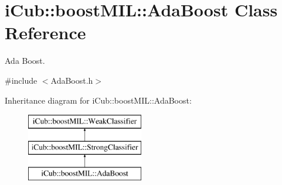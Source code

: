 \section{i\+Cub\+:\+:boost\+M\+I\+L\+:\+:Ada\+Boost Class Reference}
\label{classiCub_1_1boostMIL_1_1AdaBoost}


Ada Boost.  




{\ttfamily \#include $<$Ada\+Boost.\+h$>$}

Inheritance diagram for i\+Cub\+:\+:boost\+M\+I\+L\+:\+:Ada\+Boost\+:\begin{figure}[H]
\begin{center}
\leavevmode
\includegraphics[height=3.000000cm]{classiCub_1_1boostMIL_1_1AdaBoost}
\end{center}
\end{figure}
